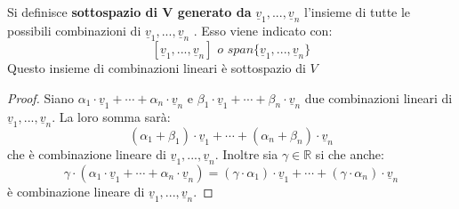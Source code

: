 \documentclass[a4paper,12pt, oneside]{book}
\begin{document}
\begin{definizione}
	Si definisce \textbf{sottospazio di V generato da} $\underline{v}_1,...,\underline{v}_n$ l'insieme di tutte le possibili combinazioni di $\underline{v}_1,...,\underline{v}_n$ . Esso viene indicato con:
	$$[\underline{v}_1,...,\underline{v}_n]\,\, o\,\, span\{\underline{v}_1,...,\underline{v}_n\}$$
	Questo insieme di combinazioni lineari è sottospazio di $V$
	\begin{proof}
		Siano $\alpha_1\cdot \underline{v}_1+\cdots+\alpha_n\cdot \underline{v}_n$ e $\beta_1\cdot \underline{v}_1+\cdots+\beta_n\cdot \underline{v}_n$ due combinazioni lineari di $\underline{v}_1,...,\underline{v}_n$. La loro somma sarà:
		$$(\alpha_1+\beta_1)\cdot\underline{v}_1+\cdots+(\alpha_n+\beta_n)\cdot \underline{v}_n$$
		che è combinazione lineare di $\underline{v}_1,...,\underline{v}_n$. Inoltre sia $\gamma\in\mathbb{R}$ si che anche:
		$$\gamma\cdot(\alpha_1\cdot \underline{v}_1+\cdots+\alpha_n\cdot \underline{v}_n)=(\gamma\cdot\alpha_1)\cdot \underline{v}_1+\cdots+(\gamma\cdot\alpha_n)\cdot \underline{v}_n$$
		è combinazione lineare di $\underline{v}_1,...,\underline{v}_n$.
	\end{proof}
\end{definizione}
\end{document}
